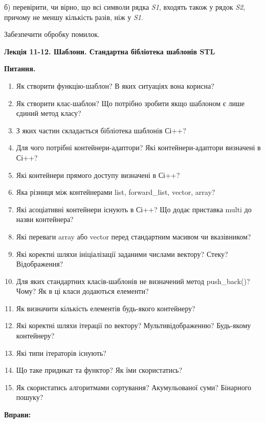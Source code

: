 \documentclass[]{article}
\begin{document}
б) перевірити, чи вірно, що всі символи рядка \emph{S1}, входять також у
рядок \emph{S2}, причому не меншу кількість разів, ніж у \emph{S1}.

Забезпечити обробку помилок.

\textbf{Лекція 11-12. Шаблони. Стандартна бібліотека шаблонів STL}

\protect\hypertarget{_Hlk57989145}{}{}\textbf{Питання.}

\begin{enumerate}
\def\labelenumi{\arabic{enumi})}
\item
  Як створити функцію-шаблон? В яких ситуаціях вона корисна?
\item
  Як створити клас-шаблон? Що потрібно зробити якщо шаблоном є лише
  єдиний метод класу?
\item
  З яких частин складається бібліотека шаблонів Сі++?
\item
  Для чого потрібні контейнери-адаптори? Які контейнери-адаптори
  визначені в Сі++?
\item
  Які контейнери прямого доступу визначені в Сі++?
\item
  Яка різниця між контейнерами list, forward\_list, vector, array?
\item
  Які асоціативні контейнери існують в Сі++? Що додає приставка multi до
  назви контейнера?
\item
  Які переваги array або vector перед стандартним масивом чи
  вказівником?
\item
  Які коректні шляхи ініціалізації заданими числами вектору? Стеку?
  Відображення?
\item
  Для яких стандартних класів-шаблонів не визначений метод push\_back()?
  Чому? Як в ці класи додаються елементи?
\item
  Як визначити кількість елементів будь-якого контейнеру?
\item
  Які коректні шляхи ітерації по вектору? Мультивідображенню? Будь-якому
  контейнеру?
\item
  Які типи ітераторів існують?
\item
  Що таке придикат та функтор? Як їми скористатись?
\item
  Як скористатись алгоритмами сортування? Акумульованої суми? Бінарного
  пошуку?
\end{enumerate}

\textbf{Вправи:}
\end{document}
